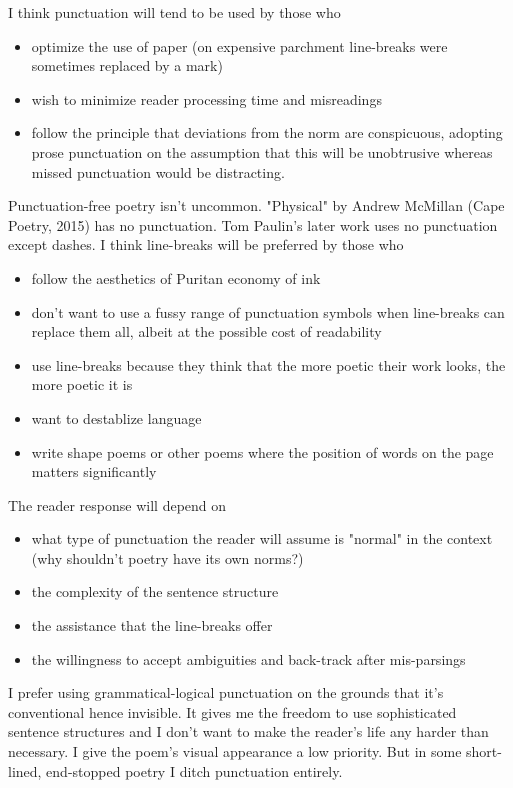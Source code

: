 \documentclass[11pt]{article}
\begin{document}
I think punctuation will tend to be used by those who
\begin{itemize}
\item optimize the use of paper (on expensive parchment line-breaks were sometimes
  replaced by a mark)
\item wish to minimize reader processing time and misreadings
\item follow the principle that deviations from the norm are conspicuous, adopting prose punctuation on the  assumption
that this will be unobtrusive whereas missed punctuation would be distracting.

\end{itemize}

Punctuation-free poetry isn't uncommon. "Physical" by Andrew McMillan (Cape Poetry, 2015) has no punctuation. Tom Paulin's later work uses no punctuation except dashes. I think line-breaks will be preferred by those who
\begin{itemize}
\item follow the aesthetics of Puritan economy of ink
\item don't want to use a fussy range of punctuation symbols when line-breaks can replace them all, albeit at the possible cost of readability
\item use  line-breaks because they think that the more poetic their work looks, the more poetic it is
\item want to destablize language
\item write shape poems or other poems where the position of words on the page matters significantly
\end{itemize}


 The reader response will depend on
\begin{itemize}
\item what type of punctuation  the  reader will assume is "normal" in the context (why shouldn't poetry have its own norms?)
\item the complexity of the sentence structure
\item the assistance that the line-breaks offer
\item the willingness to accept ambiguities and back-track after mis-parsings
\end{itemize}

I prefer using grammatical-logical punctuation on the grounds that it's conventional hence invisible. It gives me the freedom to use sophisticated sentence structures and I don't want to make the reader's life any harder than necessary. I give the poem's visual appearance a low priority. But in some short-lined, end-stopped poetry I ditch
  punctuation entirely.
\end{document}
